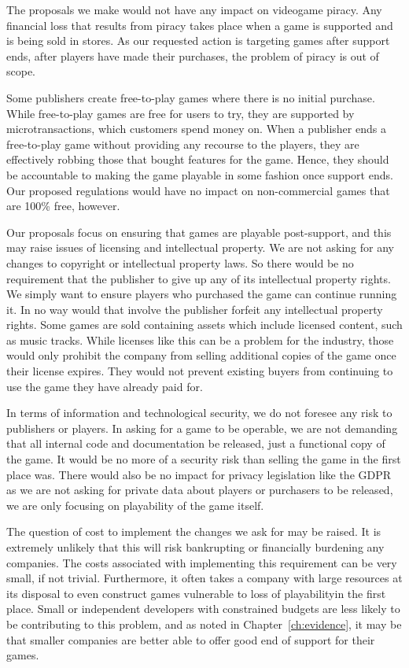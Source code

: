 The proposals we make would not have any impact on videogame piracy.
Any financial loss that results from piracy takes place when a game is supported and is being sold in stores.
As our requested action is targeting games after support ends, after players have made their purchases, the problem of piracy is out of scope.

Some publishers create free-to-play games where there is no initial purchase.
While free-to-play games are free for users to try, they are supported by \glspl{microtransaction}, which customers spend money on.
When a publisher ends a free-to-play game without providing any recourse to the players, they are effectively robbing those that bought features for the game.
Hence, they should be accountable to making the game playable in some fashion once support ends.
Our proposed regulations would have no impact on non-commercial games that are 100\% free, however.

Our proposals focus on ensuring that games are playable post-support, and this may raise issues of licensing and intellectual property.
We are not asking for any changes to copyright or intellectual property laws.
So there would be no requirement that the publisher to give up any of its intellectual property rights.
We simply want to ensure players who purchased the game can continue running it.
In no way would that involve the publisher forfeit any intellectual property rights.
Some games are sold containing \glspl{asset} which include licensed content, such as music tracks.
While licenses like this can be a problem for the industry, those would only prohibit the company from selling additional copies of the game once their license expires.
They would not prevent existing buyers from continuing to use the game they have already paid for.

In terms of information and technological security, we do not foresee any risk to publishers or players.
In asking for a game to be operable, we are not demanding that all internal code and documentation be released, just a functional copy of the game.
It would be no more of a security risk than selling the game in the first place was.
There would also be no impact for privacy legislation like the GDPR as we are not asking for private data about players or purchasers to be released,
we are only focusing on playability of the game itself.

The question of cost to implement the changes we ask for may be raised.
It is extremely unlikely that this will risk bankrupting or financially burdening any companies.
The costs associated with implementing this requirement can be very small, if not trivial\cn.
Furthermore, it often takes a company with large resources at its disposal to even construct games vulnerable to loss of playability\cn in the first place.
Small or independent developers with constrained budgets are less likely to be contributing to this problem,
and as noted in Chapter~\ref{ch:evidence}, it may be that smaller companies are better able to offer good end of support for their games.
